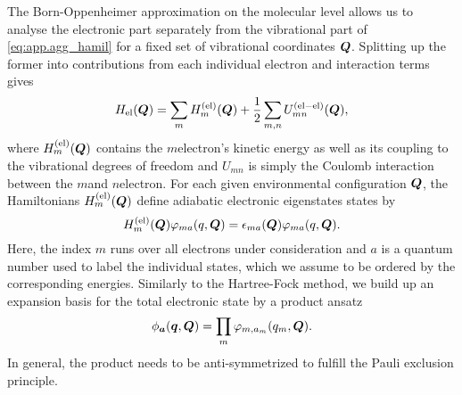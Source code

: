 
The Born-Oppenheimer approximation on the molecular level allows us to analyse the electronic part separately from the vibrational part of \autoref{eq:app.agg_hamil} for a fixed set of vibrational coordinates $\boldsymbol{Q}$.
Splitting up the former into contributions from each individual electron and interaction terms gives
\begin{equation}
  H_\mathrm{el}(\boldsymbol{Q}) = \sum_m H_m^\mathrm{(el)}(\boldsymbol{Q}) + \frac{1}{2} \sum_{m,n} U_{mn}^\mathrm{(el-el)}(\boldsymbol{Q}),
  \label{eq:app.el_hamiltonian}
\end{equation}
where $H_m^\mathrm{(el)}(\boldsymbol{Q})$ contains the $m$\th electron's kinetic energy as well as its coupling to the vibrational degrees of freedom and $U_{mn}$ is simply the Coulomb interaction between the $m$\th and $n$\th electron.
For each given environmental configuration $\boldsymbol{Q}$, the  Hamiltonians $H_m^\mathrm{(el)}(\boldsymbol{Q})$ define adiabatic electronic eigenstates states by
\begin{equation*}
  H_m^\mathrm{(el)}(\boldsymbol{Q}) \varphi_{ma} (q, \boldsymbol{Q}) = \epsilon_{ma}(\boldsymbol{Q}) \varphi_{ma} (q, \boldsymbol{Q}).
  \label{eq:app.el_eigenstates}
\end{equation*}
Here, the index $m$ runs over all electrons under consideration and $a$ is a quantum number used to label the individual states, which we assume to be ordered by the corresponding energies.
Similarly to the Hartree-Fock method, we build up an expansion basis for the total electronic state by a product ansatz
\begin{equation}
  \phi_{\boldsymbol{a}}(\boldsymbol{q}, \boldsymbol{Q}) = \prod_m \varphi_{m, a_m}(q_m, \boldsymbol{Q}).
  \label{eq:app.product_states}
\end{equation}
In general, the product needs to be anti-symmetrized to fulfill the Pauli exclusion principle.

